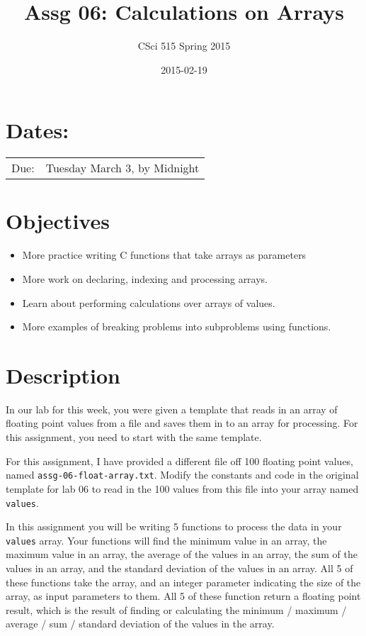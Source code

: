 \documentclass[11pt]{article}
\title{Assg 06: Calculations on Arrays}
\author{CSci 515 Spring 2015}
\date{2015-02-19}
\begin{document}
\maketitle


\section*{Dates:}
\label{sec-1}


\begin{center}
\begin{tabular}{ll}
 Due:  &  Tuesday March 3, by Midnight  \\
\end{tabular}
\end{center}
\section*{Objectives}
\label{sec-2}

\begin{itemize}
\item More practice writing C functions that take arrays as parameters
\item More work on declaring, indexing and processing arrays.
\item Learn about performing calculations over arrays of values.
\item More examples of breaking problems into subproblems using functions.
\end{itemize}
\section*{Description}
\label{sec-3}

In our lab for this week, you were given a template that reads in an array
of floating point values from a file and saves them in to an array for processing.
For this assignment, you need to start with the same template.

For this assignment, I have provided a different file off 100 floating
point values, named \verb~assg-06-float-array.txt~.  Modify the constants and
code in the original template for lab 06 to read in the 100 values
from this file into your array named \verb~values~.

In this assignment you will be writing 5 functions to process the data
in your \verb~values~ array.  Your functions will find the minimum value in
an array, the maximum value in an array, the average of the values in
an array, the sum of the values in an array, and the standard deviation
of the values in an array.  All 5 of these functions take the array,
and an integer parameter indicating the size of the array, as input
parameters to them.  All 5 of these function return a floating point
result, which is the result of finding or calculating the minimum /
maximum / average / sum / standard deviation of the values in the array.
\end{document}
